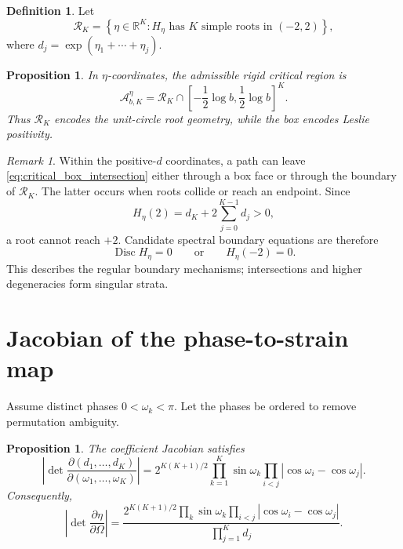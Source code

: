 \documentclass[11pt]{amsart}
\numberwithin{equation}{section}
\theoremstyle{plain}
\newtheorem{proposition}[theorem]{Proposition}
\theoremstyle{definition}
\newtheorem{definition}[theorem]{Definition}
\theoremstyle{remark}
\newtheorem{remark}[theorem]{Remark}
\begin{document}
\begin{definition}
\label{def:universal_region}
Let
\begin{equation}
\mathcal R_K
=
\left\{
\eta\in\mathbb R^K:
H_\eta\text{ has }K\text{ simple roots in }(-2,2)
\right\},
\label{eq:universal_region}
\end{equation}
where $d_j=\exp(\eta_1+\cdots+\eta_j)$.
\end{definition}

\begin{proposition}
\label{prop:separation_geometry_positivity}
In $\eta$-coordinates, the admissible rigid critical region is
\begin{equation}
\mathcal A^{\eta}_{b,K}
=
\mathcal R_K
\cap
\left[-\frac12\log b,\frac12\log b\right]^K.
\label{eq:critical_box_intersection}
\end{equation}
Thus $\mathcal R_K$ encodes the unit-circle root geometry, while the box encodes Leslie positivity.
\end{proposition}

\begin{remark}
\label{rem:two_boundary_mechanisms}
Within the positive-$d$ coordinates, a path can leave \eqref{eq:critical_box_intersection} either through a box face or through the boundary of $\mathcal R_K$.  The latter occurs when roots collide or reach an endpoint.  Since
\begin{equation}
H_\eta(2)=d_K+2\sum_{j=0}^{K-1}d_j>0,
\label{eq:H_at_plus_two}
\end{equation}
a root cannot reach $+2$.  Candidate spectral boundary equations are therefore
\begin{equation}
\operatorname{Disc}H_\eta=0
\qquad\text{or}\qquad
H_\eta(-2)=0.
\label{eq:critical_region_boundary}
\end{equation}
This describes the regular boundary mechanisms; intersections and higher degeneracies form singular strata.
\end{remark}

\section{Jacobian of the phase-to-strain map}
\label{sec:eta_jacobian}

Assume distinct phases $0<\omega_k<\pi$.  Let the phases be ordered to remove permutation ambiguity.

\begin{proposition}
\label{prop:d_jacobian}
The coefficient Jacobian satisfies
\begin{equation}
\left|
\det\frac{\partial(d_1,\ldots,d_K)}
{\partial(\omega_1,\ldots,\omega_K)}
\right|
=
2^{K(K+1)/2}
\prod_{k=1}^{K}\sin\omega_k
\prod_{i<j}|\cos\omega_i-\cos\omega_j|.
\label{eq:d_jacobian}
\end{equation}
Consequently,
\begin{equation}
\left|
\det\frac{\partial\eta}{\partial\Omega}
\right|
=
\frac{
2^{K(K+1)/2}
\displaystyle\prod_k\sin\omega_k
\displaystyle\prod_{i<j}|\cos\omega_i-\cos\omega_j|
}{\displaystyle\prod_{j=1}^{K}d_j}.
\label{eq:eta_jacobian}
\end{equation}
\end{proposition}
\end{document}
